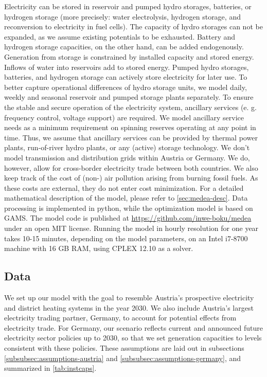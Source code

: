 \documentclass[review, 3p, times, 12pt, authoryear]{elsarticle}
\begin{document}
    Electricity can be stored in reservoir and pumped hydro storages, batteries, or hydrogen storage (more precisely: water electrolysis, hydrogen storage, and reconversion to electricity in fuel cells).
    The capacity of hydro storages can not be expanded, as we assume existing potentials to be exhausted.
    Battery and hydrogen storage capacities, on the other hand, can be added endogenously.
    Generation from storage is constrained by installed capacity and stored energy.
    Inflows of water into reservoirs add to stored energy.
    Pumped hydro storages, batteries, and hydrogen storage can actively store electricity for later use.
    To better capture operational differences of hydro storage units, we model daily, weekly and seasonal reservoir and pumped storage plants separately.
    To ensure the stable and secure operation of the electricity system, ancillary services (e. g. frequency control, voltage support) are required.
    We model ancillary service needs as a minimum requirement on spinning reserves operating at any point in time.
    Thus, we assume that ancillary services can be provided by thermal power plants, run-of-river hydro plants, or any (active) storage technology.
    We don't model transmission and distribution grids within Austria or Germany.
    We do, however, allow for cross-border electricity trade between both countries.
    We also keep track of the cost of (non-) air pollution arising from burning fossil fuels.
    As these costs are external, they do not enter cost minimization.
    For a detailed mathematical description of the model, please refer to \ref{sec:medea-desc}.
    Data processing is implemented in python, while the optimization model is based on GAMS. The model code is published at \url{https://github.com/inwe-boku/medea} under an open MIT license.
    Running the model in hourly resolution for one year takes 10-15 minutes, depending on the model parameters, on an Intel i7-8700 machine with 16 GB RAM, using CPLEX 12.10 as a solver.


    \subsection{Data} \label{subsec:data}
    We set up our model with the goal to resemble Austria's prospective electricity and district heating systems in the year 2030.
    We also include Austria's largest electricity trading partner, Germany, to account for potential effects from electricity trade.
    For Germany, our scenario reflects current and announced future electricity sector policies up to 2030, so that we set generation capacities to levels consistent with these policies.
    These assumptions are laid out in subsections \ref{subsubsec:assumptions-austria} and \ref{subsubsec:assumptions-germany}, and summarized in \autoref{tab:instcaps}.
\end{document}

